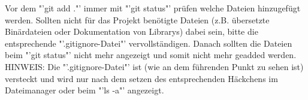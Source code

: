 Vor dem "'git add ."' immer mit "'git status"' prüfen welche Dateien hinzugefügt werden. Sollten nicht für das Projekt benötigte Dateien (z.B. übersetzte Binärdateien oder Dokumentation von Librarys) dabei sein, bitte die entsprechende "'.gitignore-Datei"' vervollständigen. Danach sollten die Dateien beim "'git status"' nicht mehr angezeigt und somit nicht mehr geadded werden.\\
HINWEIS: Die "'.gitignore-Datei"' ist (wie an dem führenden Punkt zu sehen ist) versteckt und wird nur nach dem setzen des entsprechenden Häckchens im Dateimanager oder beim "'ls -a"' angezeigt.
\nsecend
\nsecend
\nsecend